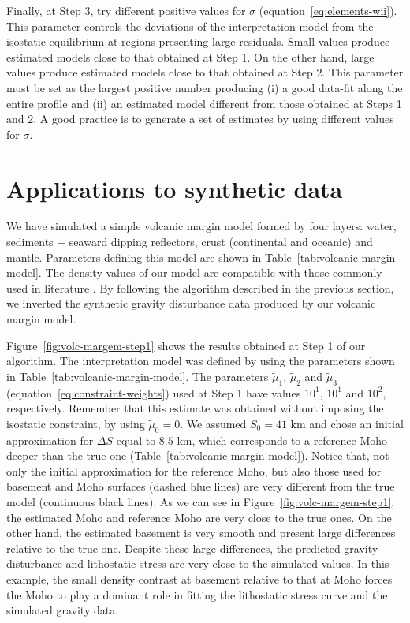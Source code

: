 \documentclass[manuscript]{geophysics}
\begin{document}
Finally, at Step 3, try different positive values for $\sigma$ (equation~\ref{eq:elements-wii}).
This parameter controls the deviations of the interpretation model from the
isostatic equilibrium at regions presenting large residuals.
Small values produce estimated models close to that obtained at Step 1.
On the other hand, large values produce estimated models close to that
obtained at Step 2.
This parameter must be set as the largest positive number producing (i) a good data-fit
along the entire profile and (ii) an estimated model different from those obtained
at Steps 1 and 2.
A good practice is to generate a set of estimates by using different values for $\sigma$. 


\section{Applications to synthetic data}


We have simulated a simple volcanic margin model formed by four layers: 
water, sediments + seaward dipping reflectors, crust (continental and oceanic) 
and mantle. 
Parameters defining this model are shown in Table~\ref{tab:volcanic-margin-model}.
The density values of our model are compatible with those commonly used in literature
\citep[e.g., ][]{gradmann-etal2017}.
By following the algorithm described in the previous section, we inverted the synthetic 
gravity disturbance data produced by our volcanic margin model.

Figure~\ref{fig:volc-margem-step1} shows the results obtained at Step 1 of our
algorithm.
The interpretation model was defined by using the parameters shown in
Table~\ref{tab:volcanic-margin-model}.
The parameters $\tilde{\mu}_{1}$, $\tilde{\mu}_{2}$ and 
$\tilde{\mu}_{3}$ (equation~\ref{eq:constraint-weights}) used at Step 1 
have values $10^{1}$, $10^{1}$ and $10^{2}$, respectively.
Remember that this estimate was obtained without imposing the 
isostatic constraint, by using $\tilde{\mu}_{0} = 0$.
We assumed $S_{0} = 41$ km and chose an initial approximation for $\Delta S$
equal to $8.5$ km, which corresponds to a reference Moho deeper 
than the true one (Table~\ref{tab:volcanic-margin-model}).
Notice that, not only the initial approximation for the reference Moho,
but also those used for basement and Moho surfaces 
(dashed blue lines) are very different from
the true model (continuous black lines).
As we can see in Figure~\ref{fig:volc-margem-step1}, the estimated Moho and reference 
Moho are very close to the true ones.
On the other hand, the estimated basement is very smooth and present large differences
relative to the true one.
Despite these large differences, 
the predicted gravity disturbance and lithostatic stress 
are very close to the simulated values.
In this example, the small density contrast at basement relative to that at Moho
forces the Moho to play a dominant role in fitting the
lithostatic stress curve and the simulated gravity data.
\end{document}

